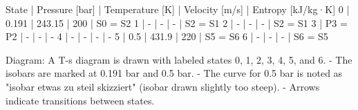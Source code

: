 State | Pressure [bar] | Temperature [K] | Velocity [m/s] | Entropy [kJ/kg·K]  
0 | 0.191 | 243.15 | 200 | S0 = S2  
1 | - | - | - | S2 = S1  
2 | - | - | - | S2 = S1  
3 | P3 = P2 | - | - | -  
4 | - | - | - | -  
5 | 0.5 | 431.9 | 220 | S5 = S6  
6 | - | - | - | S6 = S5  

Diagram:  
A T-s diagram is drawn with labeled states 0, 1, 2, 3, 4, 5, and 6.  
- The isobars are marked at 0.191 bar and 0.5 bar.  
- The curve for 0.5 bar is noted as "isobar etwas zu steil skizziert" (isobar drawn slightly too steep).  
- Arrows indicate transitions between states.